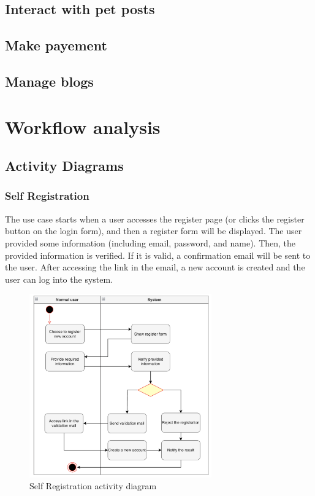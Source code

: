 \subsection{Interact with pet posts}
\subsection{Make payement}
\subsection{Manage blogs}

\section{Workflow analysis}
\subsection{Activity Diagrams}

\subsubsection{Self Registration}

The use case starts when a user accesses the register page (or clicks the register button on the login form), and then a register form will be displayed. The user provided some information (including email, password, and name). Then,  the provided information is verified. If it is valid, a confirmation email will be sent to the user. After accessing the link in the email, a new account is created and the user can log into the system.

\begin{figure}[H]
  \centering
  \includegraphics[width=0.7\textwidth]{Figures/self_register.png}
  \caption{Self Registration activity diagram}
  \label{fig:self-registration}
\end{figure}


